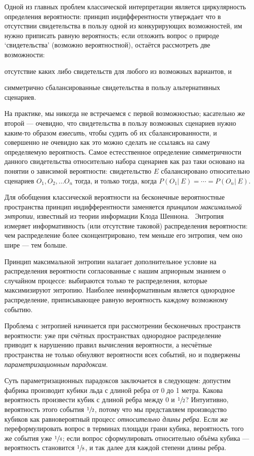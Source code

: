 \documentclass[14pt, a4paper, pdftex]{extarticle}
\begin{document}
Одной из главных проблем классической интерпретации является циркулярность определения вероятности: принцип индифферентности утверждает что в отсутствии свидетельства в пользу одной из конкурирующих возможностей, им нужно приписать равную вероятность; если отложить вопрос о природе `свидетельства' (возможно вероятностной), остаётся рассмотреть две возможности:
\begin{inparaenum}[1)]
\item отсутствие каких либо свидетельств для любого из возможных вариантов, и
\item симметрично сбалансированные свидетельства в пользу альтернативных сценариев.
\end{inparaenum}
На практике, мы никогда не встречаемся с первой возможностью; касательно же второй --- очевидно, что свидетельства в пользу возможных сценариев нужно каким-то образом \emph{взвесить}, чтобы судить об их сбалансированности, и совершенно не очевидно как это можно сделать не ссылаясь на саму определяемую вероятность. Самое естесственное определение симметричности данного свидетельства относительно набора сценариев как раз таки основано на понятии о зависимой вероятности: свидетельство $E$ сбалансировано относительно сценариев $O_1, O_2,\dots O_n$  тогда, и только тогда, когда $P(O_1|~ E) = \cdots = P(O_n|~ E)$.

Для обобщения классической вероятности на бесконечные вероятностные пространства принцип индифферентности заменяется \emph{принципом максимальной энтропии}, известный из теории информации Клода Шеннона.~\cite{Shannon} Энтропия измеряет информативность (или отсутствие таковой) распределения вероятности: чем распределение более сконцентрировано, тем меньше его энтропия, чем оно шире --- тем больше. 

Принцип максимальной энтропии налагает дополнительное условие на распределения вероятности согласованные с нашим априорным знанием о случайном процессе: выбираются только те распределения, которые максимизируют энтропию. Наиболее неинформативным является однородное распределение, приписывающее равную вероятность каждому возможному событию.

Проблема с энтропией начинается при рассмотрении бесконечных пространств вероятности: уже при счётных пространствах однородное распределение приводит к нарушению правил вычисления вероятности, а несчётные пространства не только обнуляют вероятности всех событий, но и подвержены \emph{параметризационным парадоксам}.

Суть параметризационных парадоксов заключается в следующем: допустим фабрика производит кубики льда с длиной ребра от 0 до 1 метра. Какова вероятность произвести кубик с длиной ребра между 0 и $\sfrac12$? Интуитивно, вероятность этого события $\sfrac12$, потому что мы представляем производство кубиков как равновероятный процесс \emph{относительно длины ребра}. Если же переформулировать вопрос в терминах площади грани кубика, вероятность того же события уже $\sfrac14$; если вопрос сформулировать относительно объёма кубика --- вероятность становится $\sfrac18$, и так далее для каждой степени длины ребра. 
\end{document}

